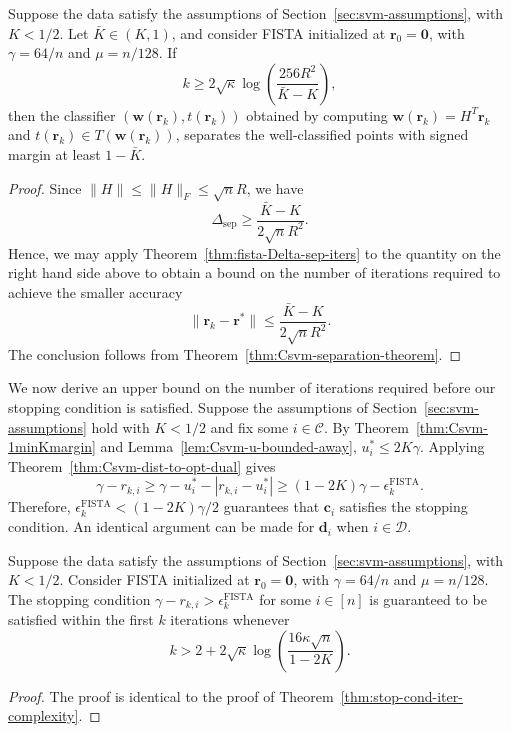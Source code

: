 \documentclass[twoside,11pt]{article}
\newcommand\bz{\bm{0}}
\renewcommand{\c}{\bm{c}}
\renewcommand{\d}{\bm{d}}
\renewcommand\r{\bm{r}}
\newcommand\w{\bm{w}}
\newcommand\CC{\mathcal{C}}
\newcommand\DD{\mathcal{D}}
\newcommand\sep{\mathrm{sep}}
\newcommand\FISTA{\mathrm{FISTA}}
\begin{document}
\begin{corollary} \label{cor:Csvm-fista-sep-complexity}
    Suppose the data satisfy the assumptions of Section~\ref{sec:svm-assumptions}, with $K<1/2$. Let $\bar{K} \in (K,1)$, and consider FISTA initialized
    at $\r_0 = \bz$, with $\gamma=64/n$ and $\mu=n/128$.
    If
    \[
        k \geq 2\sqrt{\kappa}\log\left(\frac{256 R^2}{\bar{K} - K}\right),
    \]
    then the classifier $(\w(\r_k), t(\r_k))$ obtained by computing $\w(\r_k) = H^T\r_k$ and $t(\r_k) \in T(\w(\r_k))$, separates the well-classified points with signed margin at least $1 - \bar{K}$.
\end{corollary}
\begin{proof}
    Since $\|H\| \leq \|H\|_F \leq \sqrt{n}R$, we have
    \[
        \Delta_{\sep} \geq \frac{\bar{K} - K}{2\sqrt{n}R^2}.
    \]
    Hence, we may apply Theorem~\ref{thm:fista-Delta-sep-iters} to the quantity on the right hand side above to obtain a bound on the number of iterations required to achieve the smaller accuracy
    \[
        \|\r_k - \r^*\| \leq \frac{\bar{K} - K}{2\sqrt{n}R^2}.
    \]
    The conclusion follows from Theorem~\ref{thm:Csvm-separation-theorem}.
\end{proof}

We now derive an upper bound on the number of iterations required before our stopping condition is satisfied. Suppose the assumptions of Section~\ref{sec:svm-assumptions} hold with $K < 1/2$ and fix some $i \in \CC$. By Theorem~\ref{thm:Csvm-1minKmargin} and Lemma~\ref{lem:Csvm-u-bounded-away}, $u_i^* \leq 2K\gamma$. Applying Theorem~\ref{thm:Csvm-dist-to-opt-dual} gives
\[
    \gamma - r_{k,i} \geq \gamma - u_i^* - |r_{k,i} - u_i^*| \geq (1-2K)\gamma - \epsilon_k^{\FISTA}.
\]
Therefore, $\epsilon_k^{\FISTA} < (1-2K)\gamma/2$ guarantees that $\c_i$ satisfies the stopping condition. An identical argument can be made for $\d_i$ when $i \in \DD$.
\begin{theorem}
    Suppose the data satisfy the assumptions of Section~\ref{sec:svm-assumptions}, with $K < 1/2$. Consider FISTA initialized at $\r_0 = \bz$, with $\gamma = 64/n$ and $\mu = n/128$. The stopping condition $\gamma - r_{k,i} > \epsilon_k^{\FISTA}$ for some $i \in [n]$ is guaranteed to be satisfied within the first $k$ iterations whenever
    \[
        k > 2 + 2\sqrt{\kappa}\log\left(\frac{16\kappa\sqrt{n}}{1-2K}\right).
    \]
\end{theorem}
\begin{proof}
    The proof is identical to the proof of Theorem~\ref{thm:stop-cond-iter-complexity}.
\end{proof}

\vskip 0.2in

\end{document}
